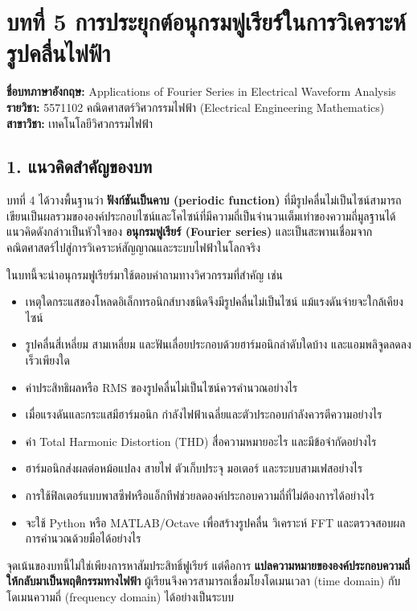 \section{บทที่ 5 การประยุกต์อนุกรมฟูเรียร์ในการวิเคราะห์รูปคลื่นไฟฟ้า}

\textbf{ชื่อบทภาษาอังกฤษ:} Applications of Fourier Series in Electrical Waveform Analysis \\
\textbf{รายวิชา:} 5571102 คณิตศาสตร์วิศวกรรมไฟฟ้า (Electrical Engineering Mathematics) \\
\textbf{สาขาวิชา:} เทคโนโลยีวิศวกรรมไฟฟ้า



\subsection{1. แนวคิดสำคัญของบท}

บทที่ 4 ได้วางพื้นฐานว่า \textbf{ฟังก์ชันเป็นคาบ (periodic function)} ที่มีรูปคลื่นไม่เป็นไซน์สามารถเขียนเป็นผลรวมขององค์ประกอบไซน์และโคไซน์ที่มีความถี่เป็นจำนวนเต็มเท่าของความถี่มูลฐานได้ แนวคิดดังกล่าวเป็นหัวใจของ \textbf{อนุกรมฟูเรียร์ (Fourier series)} และเป็นสะพานเชื่อมจากคณิตศาสตร์ไปสู่การวิเคราะห์สัญญาณและระบบไฟฟ้าในโลกจริง

ในบทนี้จะนำอนุกรมฟูเรียร์มาใช้ตอบคำถามทางวิศวกรรมที่สำคัญ เช่น

\begin{itemize}
    \item เหตุใดกระแสของโหลดอิเล็กทรอนิกส์บางชนิดจึงมีรูปคลื่นไม่เป็นไซน์ แม้แรงดันจ่ายจะใกล้เคียงไซน์
    \item รูปคลื่นสี่เหลี่ยม สามเหลี่ยม และฟันเลื่อยประกอบด้วยฮาร์มอนิกลำดับใดบ้าง และแอมพลิจูดลดลงเร็วเพียงใด
    \item ค่าประสิทธิผลหรือ RMS ของรูปคลื่นไม่เป็นไซน์ควรคำนวณอย่างไร
    \item เมื่อแรงดันและกระแสมีฮาร์มอนิก กำลังไฟฟ้าเฉลี่ยและตัวประกอบกำลังควรตีความอย่างไร
    \item ค่า Total Harmonic Distortion (THD) สื่อความหมายอะไร และมีข้อจำกัดอย่างไร
    \item ฮาร์มอนิกส่งผลต่อหม้อแปลง สายไฟ ตัวเก็บประจุ มอเตอร์ และระบบสามเฟสอย่างไร
    \item การใช้ฟิลเตอร์แบบพาสซีฟหรือแอ็กทีฟช่วยลดองค์ประกอบความถี่ที่ไม่ต้องการได้อย่างไร
    \item จะใช้ Python หรือ MATLAB/Octave เพื่อสร้างรูปคลื่น วิเคราะห์ FFT และตรวจสอบผลการคำนวณด้วยมือได้อย่างไร
\end{itemize}

จุดเน้นของบทนี้ไม่ใช่เพียงการหาสัมประสิทธิ์ฟูเรียร์ แต่คือการ \textbf{แปลความหมายขององค์ประกอบความถี่ให้กลับมาเป็นพฤติกรรมทางไฟฟ้า} ผู้เรียนจึงควรสามารถเชื่อมโยงโดเมนเวลา (time domain) กับโดเมนความถี่ (frequency domain) ได้อย่างเป็นระบบ



